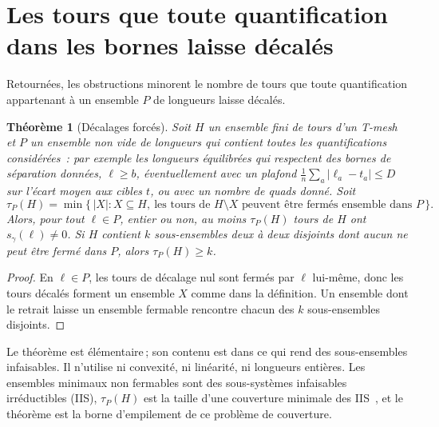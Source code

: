 \documentclass[11pt,a4paper]{article}
\newtheorem{theorem}{Théorème}
\newcommand{\shift}{s}
\begin{document}
\section{Les tours que toute quantification dans les bornes laisse décalés}\label{sec:forced}

Retournées, les obstructions minorent le nombre de tours que toute
quantification appartenant à un ensemble $P$ de longueurs laisse décalés.

\begin{theorem}[Décalages forcés]\label{thm:forced}
Soit $H$ un ensemble fini de tours d'un T-mesh et $P$ un ensemble non vide de
longueurs qui contient toutes les quantifications considérées~: par exemple
les longueurs équilibrées qui respectent des bornes de séparation données,
$\ell \ge b$, éventuellement avec un plafond $\frac1n \sum_a |\ell_a - t_a|
\le D$ sur l'écart moyen aux cibles $t$, ou avec un nombre de quads donné.
Soit
\[
  \tau_P(H) = \min\bigl\{\, |X| : X \subseteq H,\ \text{les tours de } H
  \setminus X \text{ peuvent être fermés ensemble dans } P \,\bigr\}.
\]
Alors, pour tout $\ell \in P$, entier ou non, au moins $\tau_P(H)$ tours de
$H$ ont $\shift_\gamma(\ell) \neq 0$. Si $H$ contient $k$ sous-ensembles deux
à deux disjoints dont aucun ne peut être fermé dans $P$, alors $\tau_P(H) \ge
k$.
\end{theorem}

\begin{proof}
En $\ell \in P$, les tours de décalage nul sont fermés par $\ell$ lui-même,
donc les tours décalés forment un ensemble $X$ comme dans la définition. Un
ensemble dont le retrait laisse un ensemble fermable rencontre chacun des $k$
sous-ensembles disjoints.
\end{proof}

Le théorème est élémentaire\,; son contenu est dans ce qui rend des
sous-ensembles infaisables. Il n'utilise ni convexité, ni linéarité, ni
longueurs entières. Les ensembles minimaux non fermables sont des
sous-systèmes infaisables irréductibles (IIS), $\tau_P(H)$ est la taille d'une
couverture minimale des IIS~\cite{parker1996iis,amaldi2003maxfs}, et le
théorème est la borne d'empilement de ce problème de couverture.
\end{document}
